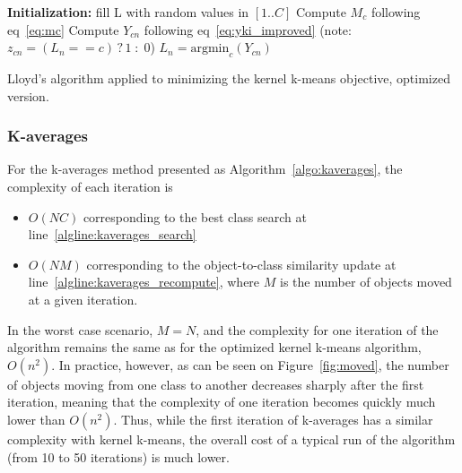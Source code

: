 \documentclass[a4paper,twoside]{article}
\begin{document}
\begin{algorithm}
	\label{algo:kkmeans_optim}
	\SetAlgoLined
	\BlankLine	
	\textbf{Initialization:}
	fill L with random values in $[1..C]$\;
	\BlankLine	
	 {
	     {
	        Compute $M_c$ following eq~\ref{eq:mc} \label{algline:kkmeans_imp_mc}
	    }
		 {
			 {
				Compute $Y_{cn}$ following eq~\ref{eq:yki_improved} \label{algline:kkmeans_imp_cplx1}
				(note: $z_{cn} = (L_n == c)\,?\,1\;:\;0$)
			}
			$L_n = \textrm{argmin}_c (Y_{cn})$\;
		}
	}
	\BlankLine
	\caption{Lloyd's algorithm applied to minimizing the kernel k-means objective, optimized version.}
\end{algorithm}


\subsubsection{K-averages}

For the k-averages method presented as Algorithm~\ref{algo:kaverages}, the complexity of each iteration is
\begin{itemize}
\item $O(NC)$ corresponding to the best class search at line~\ref{algline:kaverages_search}
\item  $O(NM)$ corresponding to the object-to-class similarity update at line~\ref{algline:kaverages_recompute}, where $M$ is the number of objects moved at a given iteration.
\end{itemize}

In the worst case scenario, $M = N$, and the complexity for one iteration of the algorithm remains the same as for the optimized kernel k-means algorithm, $O(n^2)$. In practice, however, as can be seen on Figure~\ref{fig:moved}, the number of objects moving from one class to another decreases sharply after the first iteration, meaning that the complexity of one iteration becomes quickly much lower than $O(n^2)$. Thus, while the first iteration of k-averages has a similar complexity with kernel k-means, the overall cost of a typical run of the algorithm (from 10 to 50 iterations) is much lower.
\end{document}
